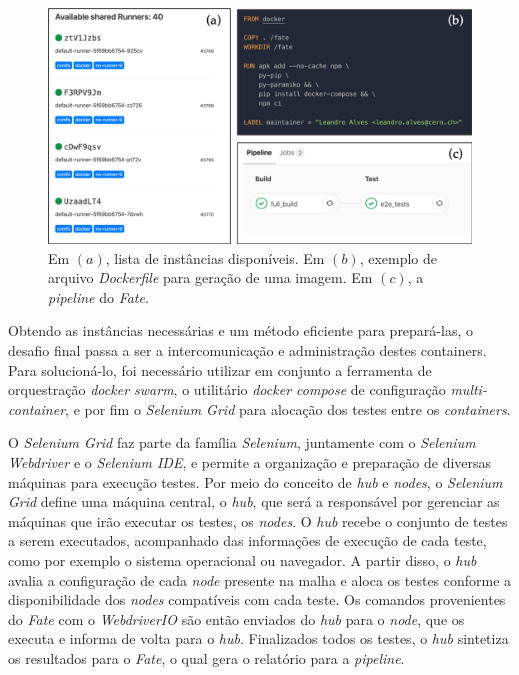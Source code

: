 \begin{figure}[H]
    \centering
    \includegraphics[width=15cm]{source/4-solucao/images/e2e-pipeline.png}
    \caption{Em $(a)$, lista de instâncias disponíveis. Em $(b)$, exemplo de arquivo \emph{Dockerfile} para geração de uma imagem. Em $(c)$, a \emph{pipeline} do \emph{Fate}.}
    \label{fig:e2e-pipeline}
\end{figure}

Obtendo as instâncias necessárias e um método eficiente para prepará-las, o desafio final passa a ser a intercomunicação e administração destes containers. Para solucioná-lo, foi necessário utilizar em conjunto a ferramenta de orquestração \emph{docker swarm}, o utilitário \emph{docker compose} de configuração \emph{multi-container}, e por fim o \emph{Selenium Grid} para alocação dos testes entre os \emph{containers}.

O \emph{Selenium Grid} faz parte da família \emph{Selenium}, juntamente com o \emph{Selenium Webdriver} e o \emph{Selenium IDE}, e permite a organização e preparação de diversas máquinas para execução testes. Por meio do conceito de \emph{hub} e \emph{nodes}, o \emph{Selenium Grid} define uma máquina central, o \emph{hub}, que será a responsável por gerenciar as máquinas que irão executar os testes, os \emph{nodes}. O \emph{hub} recebe o conjunto de testes a serem executados, acompanhado das informações de execução de cada teste, como por exemplo o sistema operacional ou navegador. A partir disso, o \emph{hub} avalia a configuração de cada \emph{node} presente na malha e aloca os testes conforme a disponibilidade dos \emph{nodes} compatíveis com cada teste. Os comandos provenientes do \emph{Fate} com o \emph{WebdriverIO} são então enviados do \emph{hub} para o \emph{node}, que os executa e informa de volta para o \emph{hub}. Finalizados todos os testes, o \emph{hub} sintetiza os resultados para o \emph{Fate}, o qual gera o relatório para a \emph{pipeline}.


